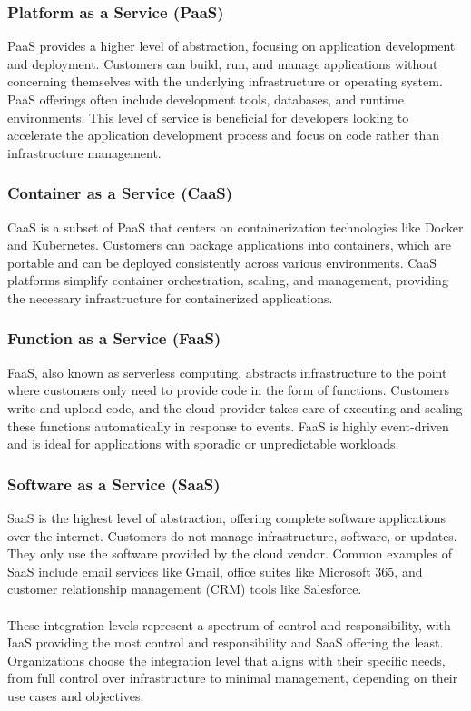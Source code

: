 \subsubsection{Platform as a Service (PaaS)}
PaaS provides a higher level of abstraction, focusing on application development and deployment.
Customers can build, run, and manage applications without concerning themselves with the underlying infrastructure or operating system.
PaaS offerings often include development tools, databases, and runtime environments.
This level of service is beneficial for developers looking to accelerate 
the application development process and focus on code rather than infrastructure management.

\subsubsection{Container as a Service (CaaS)}
CaaS is a subset of PaaS that centers on containerization technologies like Docker and Kubernetes.
Customers can package applications into containers, which are portable and can be deployed consistently across various environments.
CaaS platforms simplify container orchestration, scaling, and management, providing the necessary infrastructure for containerized applications.

\subsubsection{Function as a Service (FaaS)}
FaaS, also known as serverless computing, abstracts infrastructure to the point where customers only need to provide code in the form of functions.
Customers write and upload code, and the cloud provider takes care of executing and scaling these functions automatically in response to events.
FaaS is highly event-driven and is ideal for applications with sporadic or unpredictable workloads.

\subsubsection{Software as a Service (SaaS)}
SaaS is the highest level of abstraction, offering complete software applications over the internet.
Customers do not manage infrastructure, software, or updates. 
They only use the software provided by the cloud vendor.
Common examples of SaaS include email services like Gmail, office suites like Microsoft 365, 
and customer relationship management (CRM) tools like Salesforce.
\\\\
These integration levels represent a spectrum of control and responsibility, 
with IaaS providing the most control and responsibility and SaaS offering the least. 
Organizations choose the integration level that aligns with their specific needs, 
from full control over infrastructure to minimal management, depending on their use cases and objectives.

